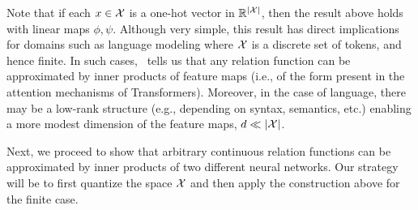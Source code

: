 Note that if each $x \in {\mathcal{X}}$ is a one-hot vector in $\mathbb{R}^{\left\lvert{\mathcal{X}}\right\rvert}$, then the result above holds with linear maps $\phi, \psi$. Although very simple, this result has direct implications for domains such as language modeling where ${\mathcal{X}}$ is a discrete set of tokens, and hence finite. In such cases,~ tells us that any relation function can be approximated by inner products of feature maps (i.e., of the form present in the attention mechanisms of Transformers). Moreover, in the case of language, there may be a low-rank structure (e.g., depending on syntax, semantics, etc.) enabling a more modest dimension of the feature maps, $d \ll \left\lvert{\mathcal{X}}\right\rvert$.

Next, we proceed to show that arbitrary continuous relation functions can be approximated by inner products of two different neural networks. Our strategy will be to first quantize the space ${\mathcal{X}}$ and then apply the construction above for the finite case.

